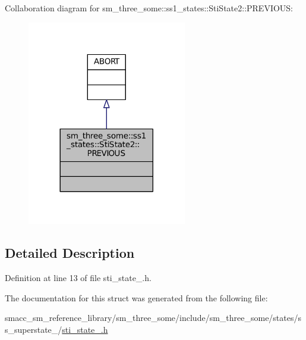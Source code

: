 Collaboration diagram for sm\+\_\+three\+\_\+some\+:\+:ss1\+\_\+states\+:\+:Sti\+State2\+:\+:P\+R\+E\+V\+I\+O\+US\+:
\nopagebreak
\begin{figure}[H]
\begin{center}
\leavevmode
\includegraphics[width=197pt]{structsm__three__some_1_1ss1__states_1_1StiState2_1_1PREVIOUS__coll__graph}
\end{center}
\end{figure}


\subsection{Detailed Description}


Definition at line 13 of file sti\+\_\+state\+\_.\+h.



The documentation for this struct was generated from the following file\+:\begin{DoxyCompactItemize}
\item 
smacc\+\_\+sm\+\_\+reference\+\_\+library/sm\+\_\+three\+\_\+some/include/sm\+\_\+three\+\_\+some/states/ss\+\_\+superstate\+\_/\hyperlink{sti__state__2_8h}{sti\+\_\+state\+\_.\+h}\end{DoxyCompactItemize}

